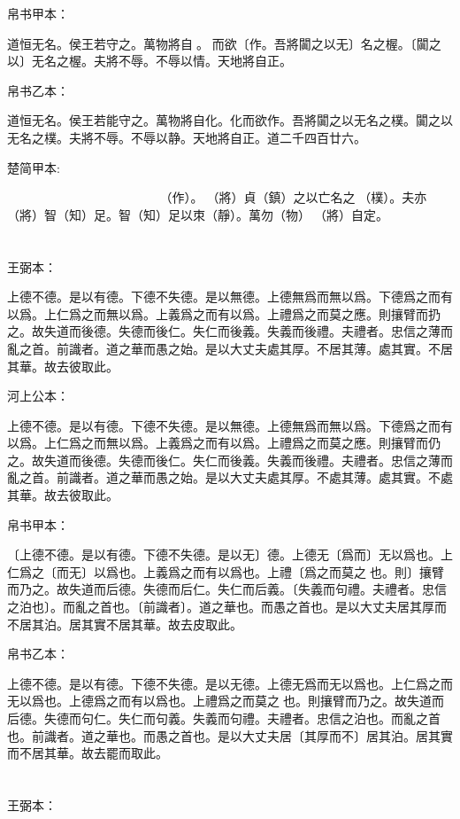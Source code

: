 \documentclass[a5paper]{ctexbook}
\begin{document}
    帛书甲本：

    道恒无名。侯王若守之。萬物將自𢡺。𢡺而欲〔作。吾將闐之以无〕名之楃。〔闐之以〕无名之楃。夫將不辱。不辱以情。天地將自正。

    帛书乙本：

    道恒无名。侯王若能守之。萬物將自化。化而欲作。吾將闐之以无名之樸。闐之以无名之樸。夫將不辱。不辱以静。天地將自正。道二千四百廿六。

    楚简甲本:

    𧗟（道）𠄨（恒）亡爲也。侯王能守之。而萬勿（物）𨟻（將）自𢠿（化）。𢠿（化）而𨿜（欲）󶴮（作）。𨟻（將）貞（鎮）之以亡名之󶴯（樸）。夫亦𨟻（將）智（知）足。智（知）足以朿（靜）。萬勿（物）𨟻（將）自定。

    \chapter{}
    王弼本：

    上德不德。是以有德。下德不失德。是以無德。上德無爲而無以爲。下德爲之而有以爲。上仁爲之而無以爲。上義爲之而有以爲。上禮爲之而莫之應。則攘臂而扔之。故失道而後德。失德而後仁。失仁而後義。失義而後禮。夫禮者。忠信之薄而亂之首。前識者。道之華而愚之始。是以大丈夫處其厚。不居其薄。處其實。不居其華。故去彼取此。

    河上公本：

    上德不德。是以有德。下德不失德。是以無德。上德無爲而無以爲。下德爲之而有以爲。上仁爲之而無以爲。上義爲之而有以爲。上禮爲之而莫之應。則攘臂而仍之。故失道而後德。失德而後仁。失仁而後義。失義而後禮。夫禮者。忠信之薄而亂之首。前識者。道之華而愚之始。是以大丈夫處其厚。不處其薄。處其實。不處其華。故去彼取此。

    帛书甲本：

    〔上德不德。是以有德。下德不失德。是以无〕德。上德无〔爲而〕无以爲也。上仁爲之〔而无〕以爲也。上義爲之而有以爲也。上禮〔爲之而莫之𤻮也。則〕攘臂而乃之。故失道而后德。失德而后仁。失仁而后義。〔失義而句禮。夫禮者。忠信之泊也〕。而亂之首也。〔前識者〕。道之華也。而愚之首也。是以大丈夫居其厚而不居其泊。居其實不居其華。故去皮取此。

    帛书乙本：

    上德不德。是以有德。下德不失德。是以无德。上德无爲而无以爲也。上仁爲之而无以爲也。上德爲之而有以爲也。上禮爲之而莫之𤻮也。則攘臂而乃之。故失道而后德。失德而句仁。失仁而句義。失義而句禮。夫禮者。忠信之泊也。而亂之首也。前識者。道之華也。而愚之首也。是以大丈夫居〔其厚而不〕居其泊。居其實而不居其華。故去罷而取此。

    \chapter{}
    王弼本：
\end{document}
